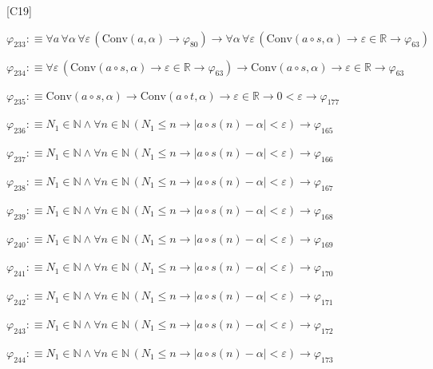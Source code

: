 \begin{fullproof}{[C19]}
\begin{abbrevlist}
\item $\varphi_{233} :\equiv \forall a\,\forall \alpha\,\forall \varepsilon\,(\mathrm{Conv}(a,\alpha) \to \varphi_{80}) \to \forall \alpha\,\forall \varepsilon\,(\mathrm{Conv}(a \circ s,\alpha) \to \varepsilon \in \mathbb{R} \to \varphi_{63})$
\item $\varphi_{234} :\equiv \forall \varepsilon\,(\mathrm{Conv}(a \circ s,\alpha) \to \varepsilon \in \mathbb{R} \to \varphi_{63}) \to \mathrm{Conv}(a \circ s,\alpha) \to \varepsilon \in \mathbb{R} \to \varphi_{63}$
\item $\varphi_{235} :\equiv \mathrm{Conv}(a \circ s,\alpha) \to \mathrm{Conv}(a \circ t,\alpha) \to \varepsilon \in \mathbb{R} \to 0 < \varepsilon \to \varphi_{177}$
\item $\varphi_{236} :\equiv N_{1} \in \mathbb{N} \land \forall n \in \mathbb{N}\,(N_{1} \leq n \to \lvert a \circ s(n) - \alpha \rvert < \varepsilon) \to \varphi_{165}$
\item $\varphi_{237} :\equiv N_{1} \in \mathbb{N} \land \forall n \in \mathbb{N}\,(N_{1} \leq n \to \lvert a \circ s(n) - \alpha \rvert < \varepsilon) \to \varphi_{166}$
\item $\varphi_{238} :\equiv N_{1} \in \mathbb{N} \land \forall n \in \mathbb{N}\,(N_{1} \leq n \to \lvert a \circ s(n) - \alpha \rvert < \varepsilon) \to \varphi_{167}$
\item $\varphi_{239} :\equiv N_{1} \in \mathbb{N} \land \forall n \in \mathbb{N}\,(N_{1} \leq n \to \lvert a \circ s(n) - \alpha \rvert < \varepsilon) \to \varphi_{168}$
\item $\varphi_{240} :\equiv N_{1} \in \mathbb{N} \land \forall n \in \mathbb{N}\,(N_{1} \leq n \to \lvert a \circ s(n) - \alpha \rvert < \varepsilon) \to \varphi_{169}$
\item $\varphi_{241} :\equiv N_{1} \in \mathbb{N} \land \forall n \in \mathbb{N}\,(N_{1} \leq n \to \lvert a \circ s(n) - \alpha \rvert < \varepsilon) \to \varphi_{170}$
\item $\varphi_{242} :\equiv N_{1} \in \mathbb{N} \land \forall n \in \mathbb{N}\,(N_{1} \leq n \to \lvert a \circ s(n) - \alpha \rvert < \varepsilon) \to \varphi_{171}$
\item $\varphi_{243} :\equiv N_{1} \in \mathbb{N} \land \forall n \in \mathbb{N}\,(N_{1} \leq n \to \lvert a \circ s(n) - \alpha \rvert < \varepsilon) \to \varphi_{172}$
\item $\varphi_{244} :\equiv N_{1} \in \mathbb{N} \land \forall n \in \mathbb{N}\,(N_{1} \leq n \to \lvert a \circ s(n) - \alpha \rvert < \varepsilon) \to \varphi_{173}$

\end{abbrevlist}
\end{fullproof}
